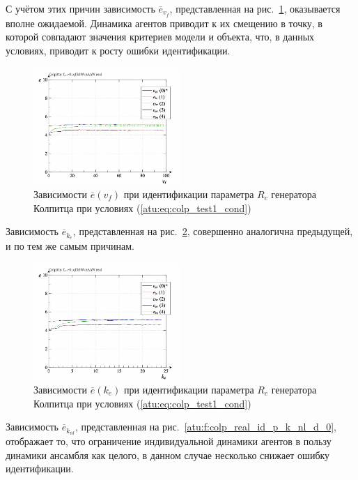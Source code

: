 С учётом этих причин зависимость
$\overline{e}_{v_f}$,
представленная на рис.~\ref{atu:f:colp_real_id_p_v_f_d_0},
оказывается вполне ожидаемой. Динамика
агентов приводит к их смещению
в точку, в которой совпадают значения критериев модели и объекта,
что, в данных условиях, приводит к росту ошибки идентификации.

\begin{figure}[htb!]
  \centerline{\includegraphics[width=0.50\textwidth]{p/r/colp_real_id-p_v_f_d_0.png} }
  \caption{Зависимости $\overline{e}(v_f)$ при идентификации параметра $R_c$ генератора Колпитца при условиях (\ref{atu:eq:colp_test1_cond})}
  \label{atu:f:colp_real_id_p_v_f_d_0}
\end{figure}

Зависимость
$\overline{e}_{k_e}$,
представленная на рис.~\ref{atu:f:colp_real_id_p_k_e_d_0},
совершенно аналогична предыдущей, и по тем же самым причинам.

\begin{figure}[htb!]
  \centerline{\includegraphics[width=0.50\textwidth]{p/r/colp_real_id-p_k_e_d_0.png} }
  \caption{Зависимости $\overline{e}(k_e)$ при идентификации параметра $R_c$ генератора Колпитца при условиях (\ref{atu:eq:colp_test1_cond})}
  \label{atu:f:colp_real_id_p_k_e_d_0}
\end{figure}

Зависимость
$\overline{e}_{k_{nl}}$,
представленная на рис.~\ref{atu:f:colp_real_id_p_k_nl_d_0},
отображает то, что ограничение индивидуальной динамики
агентов в пользу динамики ансамбля как целого,
в данном случае несколько снижает ошибку идентификации.

